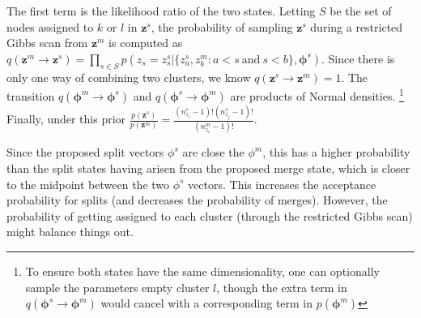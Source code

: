 \documentclass{article}
\begin{document}
The first term is the likelihood ratio of the two states.  Letting $S$ be the set of nodes assigned to $k$ or $l$ in $\mathbf{z}^{s}$, the probability of sampling $\mathbf{z}^{s}$ during a restricted Gibbs scan from  $\mathbf{z}^{m}$ is computed as $q( \mathbf{z}^{m} \rightarrow \mathbf{z}^{s}) = \prod_{s \in S} p(z_{s}=z_s^{s} |\{ z_a^{s},z_{b}^{m}: a  < s \ \mbox{and} \ s < b\}, \boldsymbol{\phi}^{s})$.  Since there is only one way of combining two clusters, we know $q(\mathbf{z}^{s} \rightarrow \mathbf{z}^{m})=1$.   The transition $q(\boldsymbol{\phi}^{m} \rightarrow \boldsymbol{\phi}^{s})$ and 
$q(\boldsymbol{\phi}^{s} \rightarrow
\boldsymbol{\phi}^{m})$ are products of Normal densities. \footnote{To ensure both states have the same dimensionality, one can optionally sample the parameters empty cluster $l$, though the extra term  in $q(\boldsymbol{\phi}^{s} \rightarrow \boldsymbol{\phi}^{m})$ would cancel with a corresponding term in $p(\boldsymbol{\phi}^{m})$}  Finally, under this prior $ \frac{p(\mathbf{z}^{s})}{p(\mathbf{z}^{m})} = \frac{(n_{z_i}^{s} - 1)!(n_{z_j}^{s} - 1)!}{(n_{z_i}^{m}-1)!}$.  

Since the proposed split vectors $\phi^s$ are close the $\phi^m$, this has a higher probability than the split states having arisen from the proposed merge state, which is closer to the midpoint between the two $\phi^s$ vectors.  This increases the acceptance probability for splits (and decreases the probability of merges).  However, the probability of getting assigned to each cluster (through the restricted Gibbs scan) might balance things out.




\end{document}
